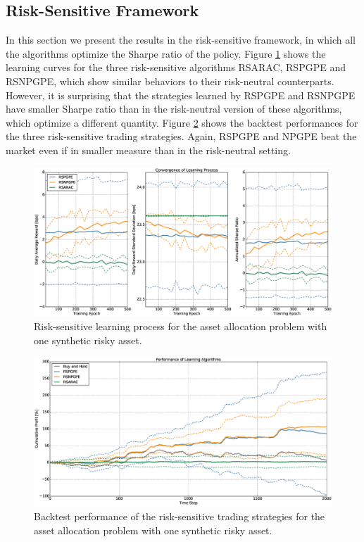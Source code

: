 \subsection{Risk-Sensitive Framework}
In this section we present the results in the risk-sensitive framework, in which all the algorithms optimize the Sharpe ratio of the policy. Figure \ref{fig:single_synthetic_sensitive_convergence} shows the learning curves for the three risk-sensitive algorithms RSARAC, RSPGPE and RSNPGPE, which show similar behaviors to their risk-neutral counterparts. However, it is surprising that the strategies learned by RSPGPE and RSNPGPE have smaller Sharpe ratio than in the risk-neutral version of these algorithms, which optimize a different quantity. Figure \ref{fig:single_synthetic_sensitive_performance} shows the backtest performances for the three risk-sensitive trading strategies. Again, RSPGPE and NPGPE beat the market even if in smaller measure than in the risk-neutral setting. 

\begin{figure}[b!]
	\centering
	\includegraphics[width=1.0\textwidth]{Images/6_2_single_synthetic_sensitive_convergence}
	\caption[Risk-sensitive learning process for one synthetic risky asset]{Risk-sensitive learning process for the asset allocation problem with one synthetic risky asset.}
	\label{fig:single_synthetic_sensitive_convergence}
\end{figure}

\begin{figure}[t!]
	\centering
	\includegraphics[width=1.0\textwidth]{Images/6_3_single_synthetic_sensitive_performance}
	\caption[Backtest performance with one synthetic risky asset]{Backtest performance of the risk-sensitive trading strategies for the asset allocation problem with one synthetic risky asset.}
	\label{fig:single_synthetic_sensitive_performance}
\end{figure}

